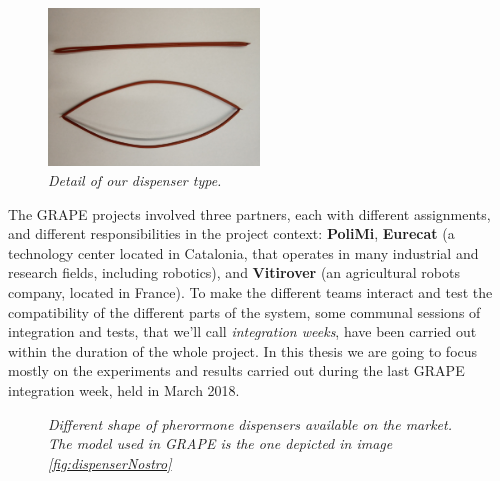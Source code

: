 \begin{figure}
	\centering
	\includegraphics[width=0.5\textwidth]{Images/grape_project/dispenserNostroVicino.jpg}
	\caption{\textit{Detail of our dispenser type.}}
	\label{fig:dispenserNostroDettaglio}
\end{figure}

The \ac{GRAPE} projects involved three partners, each with different assignments, and different responsibilities in the project context: \textbf{PoliMi}, \textbf{Eurecat} (a technology center located in Catalonia, that operates in many industrial and research fields, including robotics), and \textbf{Vitirover} (an agricultural robots company, located in France).
To make the different teams interact and test the compatibility of the different parts of the system, some communal sessions of integration and tests, that we'll call \textit{integration weeks}, have been carried out within the duration of the whole project. In this thesis we are going to focus mostly on the experiments and results carried out during the last \ac{GRAPE} integration week, held in March 2018.

\begin{figure}
	\centering
	\qquad
	\qquad
	\caption{\textit{Different shape of pherormone dispensers available on the market. The model used in \ac{GRAPE} is the one depicted in image \ref{fig:dispenserNostro}}}
	\label{fig:dispensers}
\end{figure}



